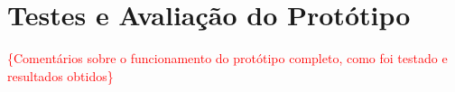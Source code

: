 \chapter{Testes e Avaliação do Protótipo}

\textcolor{red}{\{Comentários sobre o funcionamento do protótipo completo, como foi testado e resultados obtidos\}}
